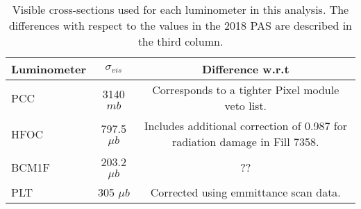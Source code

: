 \begin{table}[h]
  \caption{Visible cross-sections used for each luminometer in this analysis. The differences with respect to the values in the 2018 PAS \cite{CMS-PAS-LUM-18-002} are described in the third column.}
  \label{tab:crossections}
    \begin{tabular}{l|c|c}
      \hline
      Luminometer & $\sigma_{vis}$ & Difference w.r.t \cite{CMS-PAS-LUM-18-002}\\
      \hline
      PCC   &  3140 $mb$     & Corresponds to a tighter Pixel module veto list. \\
      HFOC  &  797.5 $\mu b$ & Includes additional correction of 0.987 for radiation damage in Fill 7358. \\
      BCM1F &  203.2 $\mu b$ &  ?? \\
      PLT   &  305 $\mu b$   & Corrected using emmittance scan data. \\
      \hline\hline
    \end{tabular}
\end{table}
